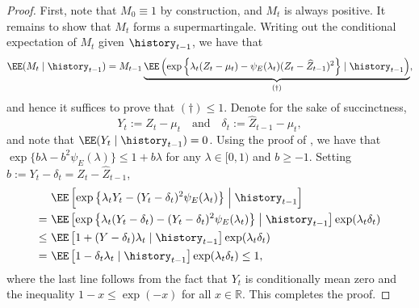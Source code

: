 \begin{proof}
First, note that $M_0 \equiv 1$ by construction, and $M_t$ is always positive. It remains to show that $M_t$ forms a supermartingale. Writing out the conditional expectation of $M_t$ given $\history_{t-1}$, we have that
\begin{align}
    \EE(M_t \mid \history_{t-1}) = M_{t-1} \underbrace{\EE \left (\exp \left \{ \lambda_t (Z_t - \mu_t) - \psi_E(\lambda_t) (Z_t - \widehat Z_{t-1})^2\right \} \mid \history_{t-1} \right )}_{(\dagger)},
\end{align}
and hence it suffices to prove that $(\dagger) \leq 1$.
Denote for the sake of succinctness,
\[Y_{t} := Z_t - \mu_t ~~~\text{ and }~~~ \delta_t := \widehat Z_{t-1} - \mu_t, \]
and note that $\EE(Y_t \mid \history_{t-1}) = 0$.
Using the proof of \citet[Proposition 4.1]{fan2015exponential}, we have that $\exp\{b\lambda  - b^2 \psi_{E} (\lambda)\} \leq 1 + b \lambda$ for any $\lambda \in [0, 1)$ and $b \geq -1$. Setting $b := Y_{t} - \delta_{t} = Z_t- \widehat Z_{t-1}$,
\begin{align*}
	&\EE \left [\exp \left \{ \lambda_t Y_{t} - (Y_{t} - \delta_{t})^2 \psi_{E}(\lambda_t ) \right \}  \Bigm | \history_{t-1} \right ]\\
	=\ &\EE \left [\exp \left \{ \lambda_t (Y_{t}-\delta_{t}) - (Y_{t} - \delta_{t})^2 \psi_{E}(\lambda_t) \right \}  \bigm | \history_{t-1} \right ] \exp(\lambda_t \delta_{t})\\
  \leq \ &\EE\left  [1 + (Y - \delta_{t} )\lambda_t \mid \history_{t-1} \right ]\exp(\lambda_t \delta_{t}) \\
  = \ &\EE\left [1 - \delta_{t} \lambda_t \mid \history_{t-1} \right ]\exp(\lambda_t \delta_{t}) \leq 1,
\end{align*}
where the last line follows from the fact that $Y_{t}$ is conditionally mean zero
and the inequality $1-x \leq \exp(-x)$ for all $x \in \mathbb R$. This completes the proof.
  
\end{proof}


